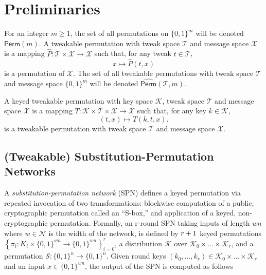 

\section{Preliminaries}
\label{sec:preliminary}

For an integer $m\geq1$, the set of all permutations on $\{0, 1\}^m$ will be denoted $\textsf{Perm}(m)$. A tweakable permutation with tweak space
$\mathcal{T}$ and message space $\mathcal{X}$ is a mapping $\widehat{P}:\mathcal{T}\times\mathcal{X}\rightarrow\mathcal{X}$ such that, for any tweak
$t\in\mathcal{T}$,
%
$$x\mapsto\widehat{P}(t,x)$$
%
is a permutation of $\mathcal{X}$. The set of all tweakable permutations with tweak space
$\mathcal{T}$ and message space $\{0, 1\}^m$ will be denoted $\widehat{\textsf{Perm}}(\mathcal{T},m)$.


A keyed tweakable permutation with key space $\mathcal{K}$, tweak space $\mathcal{T}$ and message
space $\mathcal{X}$ is a mapping $T:\mathcal{K}\times\mathcal{T}\times\mathcal{X}\rightarrow\mathcal{X}$ such that, for any key $k\in\mathcal{K}$,
%
$$(t,x)\mapsto T(k,t,x).$$
%
is a tweakable permutation with tweak space $\mathcal{T}$ and message space $\mathcal{X}$.



\subsection{(Tweakable) Substitution-Permutation Networks}
A \emph{substitution-permutation network} (SPN) defines a keyed permutation via repeated invocation of two transformations: blockwise computation of a public, cryptographic permutation called an ``S-box,'' and application of a keyed, non-cryptographic permutation. Formally, an r-round SPN taking inputs of length $w n$ where $w \in \mathcal{N}$ is the width of the network, is defined by $\mathnormal{r}+1$ keyed permutations $\left\{\pi_{i}: K_{i} \times\{0,1\}^{w n} \rightarrow\{0,1\}^{w n}\right\}_{i=0}^{r}$, a distribution $\mathcal{K}$ over $\mathcal{K}_{0} \times \dots \times \mathcal{K}_{r}$, and a permutation $\mathcal{S}:\{0,1\}^{n} \rightarrow \{0,1\}^{n}$. Given round keys $(k_{0},\dots, k_{r}) \in \mathcal{K}_{0} \times \dots \times \mathcal{K}_{r}$ and an input $x \in \{0,1\}^{w n}$, the output of the SPN is computed as follows

